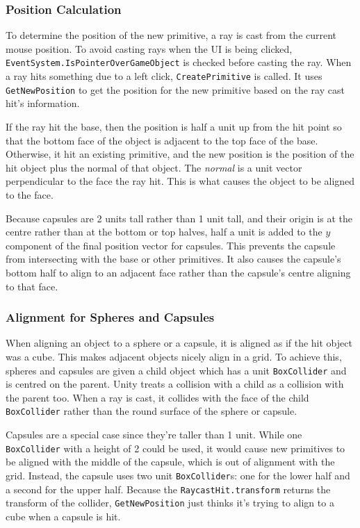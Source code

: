 \documentclass[a4paper, 12pt]{scrartcl}
\begin{document}
\subsubsection{Position Calculation}
To determine the position of the new primitive, a ray is cast from the current mouse position. To avoid casting rays when the UI is being clicked, \texttt{EventSystem.IsPointerOverGameObject} is checked before casting the ray. When a ray hits something due to a left click, \texttt{CreatePrimitive} is called. It uses \texttt{GetNewPosition} to get the position for the new primitive based on the ray cast hit's information.

If the ray hit the base, then the position is half a unit up from the hit point so that the bottom face of the object is adjacent to the top face of the base. Otherwise, it hit an existing primitive, and the new position is the position of the hit object plus the normal of that object. The \textit{normal} is a unit vector perpendicular to the face the ray hit. This is what causes the object to be aligned to the face.

Because capsules are 2 units tall rather than 1 unit tall, and their origin is at the centre rather than at the bottom or top halves, half a unit is added to the $y$ component of the final position vector for capsules. This prevents the capsule from intersecting with the base or other primitives. It also causes the capsule's bottom half to align to an adjacent face rather than the capsule's centre aligning to that face.

\subsubsection{Alignment for Spheres and Capsules}
When aligning an object to a sphere or a capsule, it is aligned as if the hit object was a cube. This makes adjacent objects nicely align in a grid. To achieve this, spheres and capsules are given a child object which has a unit \texttt{BoxCollider} and is centred on the parent. Unity treats a collision with a child as a collision with the parent too. When a ray is cast, it collides with the face of the child \texttt{BoxCollider} rather than the round surface of the sphere or capsule.

Capsules are a special case since they're taller than 1 unit. While one \texttt{BoxCollider} with a height of 2 could be used, it would cause new primitives to be aligned with the middle of the capsule, which is out of alignment with the grid. Instead, the capsule uses two unit \texttt{BoxCollider}s: one for the lower half and a second for the upper half. Because the \texttt{RaycastHit.transform} returns the transform of the collider, \texttt{GetNewPosition} just thinks it's trying to align to a cube when a capsule is hit.
\end{document}

